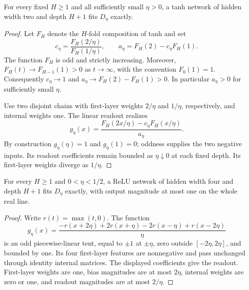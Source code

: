 \begin{lemma}
\label{width-only:lem:tanh}
For every fixed $H\ge1$ and all sufficiently small $\eta>0$, a tanh network of hidden width two and depth $H+1$ fits $D_\eta$ exactly.
\end{lemma}
\begin{proof}
Let $F_H$ denote the $H$-fold composition of tanh and set
\[
 c_\eta=\frac{F_H(2/\eta)}{F_H(1/\eta)},\qquad
 a_\eta=F_H(2)-c_\eta F_H(1).
\]
The function $F_H$ is odd and strictly increasing. Moreover,
$F_H(t)\to F_{H-1}(1)>0$ as $t\to\infty$, with the convention $F_0(1)=1$. Consequently $c_\eta\to1$ and
$a_\eta\to F_H(2)-F_H(1)>0$. In particular $a_\eta>0$ for sufficiently small $\eta$.

Use two disjoint chains with first-layer weights $2/\eta$ and $1/\eta$, respectively, and internal weights one. The linear readout realizes
\[
 g_\eta(x)=\frac{F_H(2x/\eta)-c_\eta F_H(x/\eta)}{a_\eta}.
\]
By construction $g_\eta(\eta)=1$ and $g_\eta(1)=0$; oddness supplies the two negative inputs. Its readout coefficients remain bounded as $\eta\downarrow0$ at each fixed depth. Its first-layer weights diverge as $1/\eta$.
\end{proof}

\begin{lemma}
\label{width-only:lem:relu}
For every $H\ge1$ and $0<\eta<1/2$, a ReLU network of hidden width four and depth $H+1$ fits $D_\eta$ exactly, with output magnitude at most one on the whole real line.
\end{lemma}
\begin{proof}
Write $r(t)=\max(t,0)$. The function
\[
 g_\eta(x)=\frac{-r(x+2\eta)+2r(x+\eta)-2r(x-\eta)+r(x-2\eta)}{\eta}
\]
is an odd piecewise-linear tent, equal to $\pm1$ at $\pm\eta$, zero outside $[-2\eta,2\eta]$, and bounded by one. Its four first-layer features are nonnegative and pass unchanged through identity internal matrices. The displayed coefficients give the readout. First-layer weights are one, bias magnitudes are at most $2\eta$, internal weights are zero or one, and readout magnitudes are at most $2/\eta$.
\end{proof}

